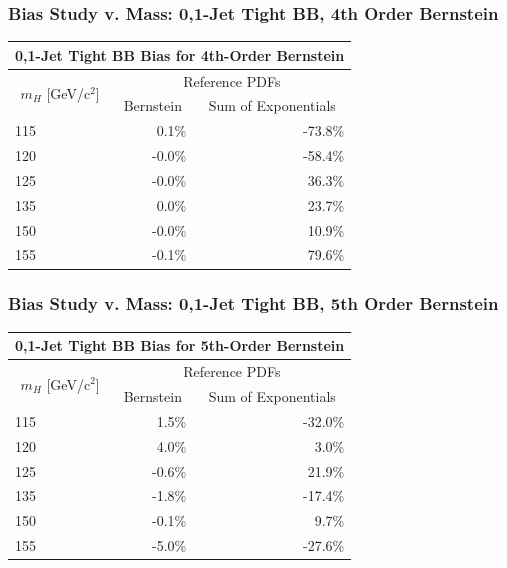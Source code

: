 \documentclass{beamer}
\begin{document}
\begin{frame}
\frametitle{Bias Study v. Mass: 0,1-Jet Tight BB, 4th Order Bernstein}
  \begin{center}
\begin{tabular}{|l|r|r|} \hline 
\multicolumn{3}{|c|}{ \bf 0,1-Jet Tight BB Bias for 4th-Order Bernstein} \\ \hline
\multicolumn{1}{|c|}{\multirow{2}{*}{$m_{H}$ [GeV/c$^{2}$]}} & \multicolumn{2}{c|}{Reference PDFs} \\ \cline{2-3} 
& \multicolumn{1}{c|}{      Bernstein} & \multicolumn{1}{c|}{Sum of Exponentials} \\ \hline
       115 &            0.1\% &          -73.8\% \\ \hline
       120 &           -0.0\% &          -58.4\% \\ \hline
       125 &           -0.0\% &           36.3\% \\ \hline
       135 &            0.0\% &           23.7\% \\ \hline
       150 &           -0.0\% &           10.9\% \\ \hline
       155 &           -0.1\% &           79.6\% \\ \hline
\end{tabular}
  \end{center}
\end{frame}

\begin{frame}
\frametitle{Bias Study v. Mass: 0,1-Jet Tight BB, 5th Order Bernstein}
  \begin{center}
\begin{tabular}{|l|r|r|} \hline 
\multicolumn{3}{|c|}{ \bf 0,1-Jet Tight BB Bias for 5th-Order Bernstein} \\ \hline
\multicolumn{1}{|c|}{\multirow{2}{*}{$m_{H}$ [GeV/c$^{2}$]}} & \multicolumn{2}{c|}{Reference PDFs} \\ \cline{2-3} 
& \multicolumn{1}{c|}{      Bernstein} & \multicolumn{1}{c|}{Sum of Exponentials} \\ \hline
       115 &            1.5\% &          -32.0\% \\ \hline
       120 &            4.0\% &            3.0\% \\ \hline
       125 &           -0.6\% &           21.9\% \\ \hline
       135 &           -1.8\% &          -17.4\% \\ \hline
       150 &           -0.1\% &            9.7\% \\ \hline
       155 &           -5.0\% &          -27.6\% \\ \hline
\end{tabular}

  \end{center}
\end{frame}
\end{document}

